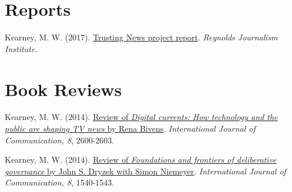 \documentclass[11pt,letterpaper]{article}
\begin{document}
\section{Reports}
  \begin{bibenum}
    \item Kearney, M. W. (2017). \href{https://www.rjionline.org/reporthtml.html}{Trusting {N}ews project report}.
    \textit{Reynolds Journalism Institute}.
  \end{bibenum}

\section{Book Reviews}
  \begin{bibenum}
    \item[] Kearney, M. W. (2014).
    \href{http://ijoc.org/index.php/ijoc/article/view/3405/1280}{Review of
    \textit{Digital currents: How technology and the public are shaping TV news} by Rena Bivens}.
    \textit{International Journal of Communication, 8}, 2600-2603.

    \item[] Kearney, M. W. (2014).
    \href{http://ijoc.org/index.php/ijoc/article/view/2899/1147}{Review of
    \textit{Foundations and frontiers of deliberative governance} by John S. Dryzek with Simon Niemeyer}.
    \textit{International Journal of Communication, 8}, 1540-1543.
  \end{bibenum}
\end{document}
